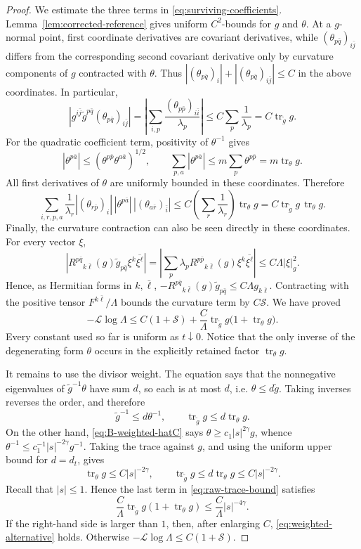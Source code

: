 \documentclass[reqno]{amsart}
\newcommand{\tr}{\operatorname{tr}}
\theoremstyle{plain}
\theoremstyle{remark}
\begin{document}
\begin{proof}
We estimate the three terms in
\eqref{eq:surviving-coefficients}.
Lemma~\ref{lem:corrected-reference} gives uniform
$C^2$-bounds for $g$ and $\theta$.  At a $g$-normal point,
first coordinate derivatives are covariant derivatives, while
$(\theta_{p\bar q})_{i\bar j}$ differs from the corresponding second
covariant derivative only by curvature components of $g$ contracted
with $\theta$.  Thus
$|(\theta_{p\bar q})_i|+|(\theta_{p\bar q})_{i\bar j}|\leq C$ in
the above coordinates.  In particular,
\[
 \left|g^{i\bar j}\widetilde g^{p\bar q}
 (\theta_{p\bar q})_{i\bar j}\right|
 =\left|\sum_{i,p}\frac{(\theta_{p\bar p})_{i\bar i}}
 {\lambda_p}\right|
 \leq C\sum_p\frac1{\lambda_p}
 =C\tr_{\widetilde g}g.
\]
For the quadratic coefficient term, positivity of $\theta^{-1}$
gives
\[
 |\theta^{p\bar a}|
 \leq(\theta^{p\bar p}\theta^{a\bar a})^{1/2},
 \qquad
 \sum_{p,a}|\theta^{p\bar a}|
 \leq m\sum_p\theta^{p\bar p}=m\tr_\theta g.
\]
All first derivatives of $\theta$ are uniformly bounded in these
coordinates.  Therefore
\[
 \sum_{i,r,p,a}\frac1{\lambda_r}
 |(\theta_{r\bar p})_i|\,|\theta^{p\bar a}|\,
 |(\theta_{a\bar r})_{\bar i}|
 \leq C\left(\sum_r\frac1{\lambda_r}\right)\tr_\theta g
 =C\tr_{\widetilde g}g\,\tr_\theta g.
\]
Finally, the curvature contraction can also be seen directly in these
coordinates.  For every vector $\xi$,
\[
 \left|R^{p\bar q}{}_{k\bar\ell}(g)
 \widetilde g_{p\bar q}\xi^k\overline{\xi^\ell}\right|
 =\left|\sum_p\lambda_pR^{p\bar p}{}_{k\bar\ell}(g)
 \xi^k\overline{\xi^\ell}\right|
 \leq C\Lambda|\xi|_g^2.
\]
 Hence, as Hermitian forms in
$k,\bar\ell$,
$-R^{p\bar q}{}_{k\bar\ell}(g)\widetilde g_{p\bar q}
\leq C\Lambda g_{k\bar\ell}$.
Contracting with the positive tensor $F^{k\bar\ell}/\Lambda$
bounds the curvature term by $C\mathcal S$.  We have proved
\begin{equation}\label{eq:raw-trace-bound}
 -\mathcal L\log\Lambda
 \leq C(1+\mathcal S)
 +\frac{C}{\Lambda}\tr_{\widetilde g}g
       \bigl(1+\tr_\theta g\bigr).
\end{equation}
Every constant used so far is uniform as $t\downarrow0$.  Notice
that the only inverse of the degenerating form $\theta$ occurs in
the explicitly retained factor $\tr_\theta g$.

It remains to use the divisor weight.  The equation says that the
nonnegative eigenvalues of $\widetilde g^{-1}\theta$ have sum $d$,
so each is at most $d$, i.e. $\theta\leq d\widetilde g$.
Taking inverses reverses the order, and therefore
\[
 \widetilde g^{-1}\leq d\theta^{-1},
 \qquad
 \tr_{\widetilde g}g\leq d\tr_\theta g.
\]
On the other hand, \eqref{eq:B-weighted-hatC} says
$\theta\geq c_1|s|^{2\gamma}g$, whence
$\theta^{-1}\leq c_1^{-1}|s|^{-2\gamma}g^{-1}$.  Taking the trace
against $g$, and using the uniform upper bound for $d=d_t$, gives
\[
 \tr_\theta g\leq C|s|^{-2\gamma},
 \qquad
 \tr_{\widetilde g}g\leq d\tr_\theta g
 \leq C|s|^{-2\gamma}.
\]
Recall that $|s|\leq1$.  Hence the last term in
\eqref{eq:raw-trace-bound} satisfies
\[
 \frac{C}{\Lambda}\tr_{\widetilde g}g
       (1+\tr_\theta g)
 \leq\frac{C}{\Lambda}|s|^{-4\gamma}.
\]
If the right-hand side is larger than $1$, then, after enlarging $C$,
\eqref{eq:weighted-alternative} holds.  Otherwise
$-\mathcal L\log\Lambda\leq C(1+\mathcal S)$.


\end{proof}
\end{document}
